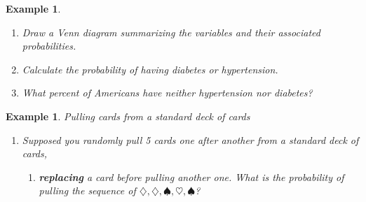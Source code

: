 \documentclass[12pt]{amsart}
\newtheorem{example}[theorem]{Example}
\begin{document}
{\begin{example}
\begin{enumerate}

\vspace{3cm}

\item Draw a Venn diagram summarizing the variables and their associated probabilities.

\vspace{5cm}

\item Calculate the probability of having diabetes or hypertension.

\vspace{4cm}

\item What percent of Americans have neither hypertension nor diabetes?



\end{enumerate}
\end{example} 





\newpage
\begin{example}Pulling cards from a standard deck of cards

\begin{enumerate}
\item Supposed you randomly pull 5 cards one after another from a standard deck of cards, 

\begin{enumerate}
\item \textbf{replacing} a card before pulling another one. What is the probability of pulling the sequence of $\diamondsuit, \diamondsuit, \spadesuit, \heartsuit, \spadesuit$?


\vspace{4cm}


\end{enumerate}
\end{enumerate}
\end{example}}
\end{document}
